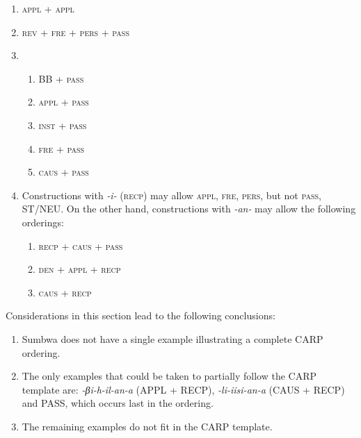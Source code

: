 \documentclass[output=paper		  ]{langscibook}
\begin{document}
\begin{enumerate}
\item \textsc{appl + appl}


\item \textsc{rev + fre + pers + pass}

\item  \begin{enumerate}
    \item  BB + \textsc{pass}


  \item \textsc{appl + pass}


  \item \textsc{inst + pass}


  \item \textsc{fre + pass}


  \item \textsc{caus + pass}
    \end{enumerate}
\item Constructions with {\textit{{}-i-}} {(\textsc{recp}) may allow \textsc{appl, fre, pers}, but not \textsc{pass}, ST/NEU. On the other hand, constructions with} {\textit{{}-an-}} may allow the following orderings:

    \begin{enumerate}
    \item \textsc{recp + caus + pass}


    \item \textsc{den + appl + recp}


    \item \textsc{caus + recp}
    \end{enumerate}
\end{enumerate}

Considerations in this section lead to the following conclusions:

\begin{enumerate}
\item {Sumbwa does not have a single example illustrating a complete CARP ordering.}

\item {The only examples that could be taken to partially follow the CARP template are:} {\textit{{}-βi-h-il-an-a}} {(APPL + RECP),} {\textit{{}-li-iisi-an-a}} {(CAUS + RECP) and PASS, which occurs last in the ordering.}

\item The remaining examples do not fit in the CARP template.
\end{enumerate}
\end{document}
